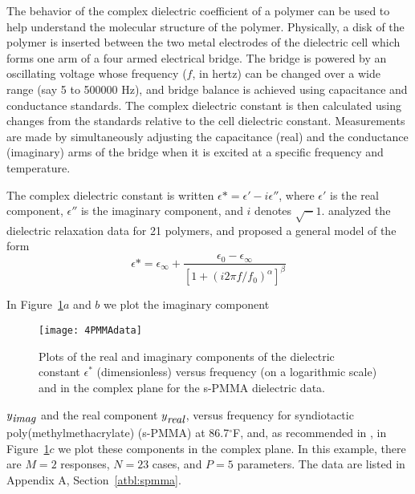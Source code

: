 \begin{example}\label{spmma:1}
The behavior of the complex dielectric coefficient of a polymer
can be used to help understand the molecular structure of the
polymer.
Physically, a disk of the polymer is inserted between the two
metal electrodes of the dielectric cell which forms one arm of a
four armed electrical bridge.
The bridge is powered by an oscillating voltage whose frequency
($f$, in hertz) can be changed over a wide range (say 5 to 500000
Hz), and bridge balance is achieved using capacitance and
conductance standards.
The complex dielectric constant is then calculated using changes
from the standards relative to the cell dielectric constant.
Measurements are made by simultaneously adjusting the capacitance
(real) and the conductance (imaginary) arms of the bridge
when it is excited at a specific frequency and temperature.

The complex dielectric constant is written
$\epsilon * = \epsilon ' - i \epsilon ''$, where
$\epsilon '$ is the real component, $\epsilon ''$ is the
imaginary component, and $i$ denotes $\sqrt -1$.
analyzed the dielectric relaxation data for 21 polymers, and
proposed a general model of the form
  \begin{equation}\label{eqn:4.1}
    \epsilon *  =  \epsilon_{\infty} +
    \frac{\epsilon_0-\epsilon_{\infty}}{\left[1+(i 2\pi f/f_0)^\alpha
    \right]^{\beta}}
  \end{equation}

In Figure~\ref{fig:PMMAdata}$a$ and $b$ we plot the imaginary component
  \begin{figure}
    \centerline{\texttt{[image: 4PMMAdata]}}%
    \caption{\label{fig:PMMAdata}
    Plots of the real and imaginary components of the dielectric constant
    $\epsilon^{*}$ (dimensionless)
    versus frequency (on a logarithmic scale) and in the complex
    plane for the s-PMMA dielectric data.
    }
  \end{figure}
$y_{\mbox{\it imag}}$ and the real component
$y_{\mbox{\it real}}$, versus frequency for syndiotactic
poly(methylmethacrylate) (s-PMMA) at 86.7$^\circ$F,
and, as recommended in ,
in Figure~\ref{fig:PMMAdata}$c$ we plot these components in the complex
plane.
In this example, there are $M = 2$ responses, $N = 23$ cases,
and $P = 5$ parameters.
The data are listed in Appendix A, Section~\ref{atbl:spmma}.
\end{example}

